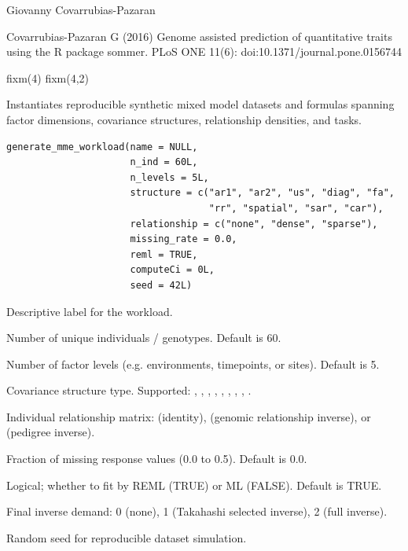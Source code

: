 \documentclass[a4paper]{book}
\begin{document}
%
\begin{Author}\relax
Giovanny Covarrubias-Pazaran
\end{Author}
%
\begin{References}\relax
Covarrubias-Pazaran G (2016) Genome assisted prediction of quantitative traits using the R package sommer. PLoS ONE 11(6): doi:10.1371/journal.pone.0156744 
\end{References}
%
\begin{Examples}
\begin{ExampleCode}
fixm(4)
fixm(4,2)
\end{ExampleCode}
\end{Examples}
%
\begin{Description}\relax
Instantiates reproducible synthetic mixed model datasets and formulas spanning
factor dimensions, covariance structures, relationship densities, and tasks.
\end{Description}
%
\begin{Usage}
\begin{verbatim}
generate_mme_workload(name = NULL,
                      n_ind = 60L,
                      n_levels = 5L,
                      structure = c("ar1", "ar2", "us", "diag", "fa",
                                    "rr", "spatial", "sar", "car"),
                      relationship = c("none", "dense", "sparse"),
                      missing_rate = 0.0,
                      reml = TRUE,
                      computeCi = 0L,
                      seed = 42L)
\end{verbatim}
\end{Usage}
%
\begin{Arguments}
\begin{ldescription}
\item[\code{name}] Descriptive label for the workload.
\item[\code{n\_ind}] Number of unique individuals / genotypes. Default is 60.
\item[\code{n\_levels}] Number of factor levels (e.g. environments, timepoints, or sites). Default is 5.
\item[\code{structure}] Covariance structure type. Supported: , ,
, , , , , , .
\item[\code{relationship}] Individual relationship matrix:  (identity),
 (genomic relationship inverse), or  (pedigree inverse).
\item[\code{missing\_rate}] Fraction of missing response values (0.0 to 0.5). Default is 0.0.
\item[\code{reml}] Logical; whether to fit by REML (TRUE) or ML (FALSE). Default is TRUE.
\item[\code{computeCi}] Final inverse demand: 0 (none), 1 (Takahashi selected inverse), 2 (full inverse).
\item[\code{seed}] Random seed for reproducible dataset simulation.
\end{ldescription}
\end{Arguments}
\end{document}

